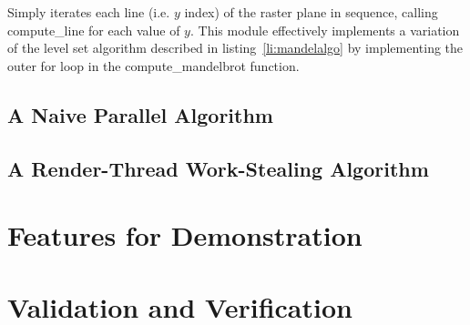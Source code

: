 Simply iterates each line (i.e. \(y\) index) of the raster plane in sequence, calling compute\_line for each value of \(y\).
This module effectively implements a variation of the level set algorithm described in listing~\ref{li:mandelalgo}
by implementing the outer for loop in the compute\_mandelbrot function.

\subsection*{A Naive Parallel Algorithm}



\subsection*{A Render-Thread Work-Stealing Algorithm}

\section{Features for Demonstration}


\section{Validation and Verification}

